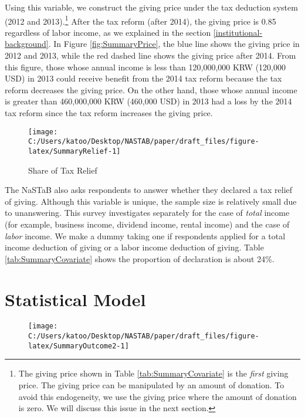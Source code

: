 \documentclass[
  11pt,
  a4paper,
]{article}
\begin{document}
Using this variable,
we construct the giving price
under the tax deduction system (2012 and 2013).\footnote{The giving price shown in Table \ref{tab:SummaryCovariate} is the \emph{first} giving price. The giving price can be manipulated by an amount of donation. To avoid this endogeneity, we use the giving price where the amount of donation is zero. We will discuss this issue in the next section.}
After the tax reform (after 2014),
the giving price is 0.85 regardless of labor income,
as we explained in the section \ref{institutional-background}.
In Figure \ref{fig:SummaryPrice},
the blue line shows the giving price in 2012 and 2013,
while the red dashed line shows the giving price after 2014.
From this figure,
those whose annual income is less than 120,000,000 KRW
(120,000 USD) in 2013 could receive benefit from the 2014 tax reform
because the tax reform decreases the giving price.
On the other hand,
those whose annual income is greater than
460,000,000 KRW (460,000 USD) in 2013 had a loss by the 2014 tax reform
since the tax reform increases the giving price.

\begin{figure}[t]

{\centering \texttt{[image: C:/Users/katoo/Desktop/NASTAB/paper/draft\_files/figure-latex/SummaryRelief-1]} 

}

\caption{Share of Tax Relief}\label{fig:SummaryRelief}
\end{figure}

The NaSTaB also asks respondents
to answer whether they declared a tax relief of giving.
Although this variable is unique,
the sample size is relatively small due to unanswering.
This survey investigates separately for the case of \emph{total} income
(for example, business income, dividend income, rental income)
and the case of \emph{labor} income.
We make a dummy taking one
if respondents applied for a total income deduction of giving
or a labor income deduction of giving.
Table \ref{tab:SummaryCovariate} shows
the proportion of declaration is about 24\%.

\hypertarget{statistical-model}{%
\section{Statistical Model}\label{statistical-model}}

\begin{figure}[t]

{\centering \texttt{[image: C:/Users/katoo/Desktop/NASTAB/paper/draft\_files/figure-latex/SummaryOutcome2-1]} 

}

\end{figure}
\end{document}
